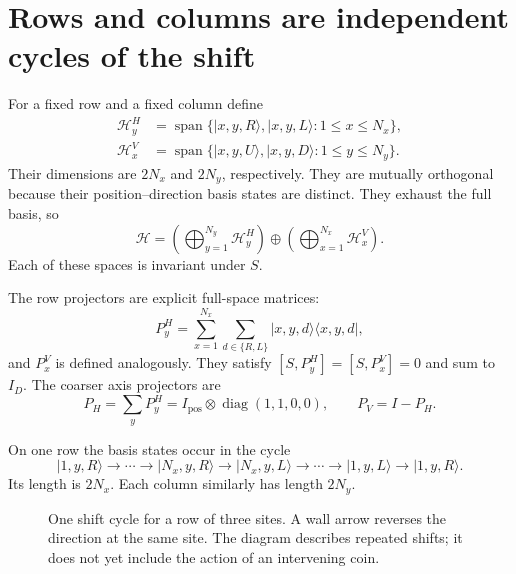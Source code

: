 \documentclass[11pt,a4paper,oneside]{report}
\newcommand{\ket}[1]{\lvert #1\rangle}
\newcommand{\bra}[1]{\langle #1\rvert}
\newcommand{\HH}{\mathcal H}
\newcommand{\Id}{I}
\newcommand{\diag}{\operatorname{diag}}
\newcommand{\spanof}{\operatorname{span}}
\numberwithin{equation}{chapter}
\begin{document}
\section{Rows and columns are independent cycles of the shift}

For a fixed row and a fixed column define
\begin{align}
\HH_y^{H}
&=\spanof\{\ket{x,y,R},\ket{x,y,L}:1\leq x\leq N_x\},\\
\HH_x^{V}
&=\spanof\{\ket{x,y,U},\ket{x,y,D}:1\leq y\leq N_y\}.
\end{align}
Their dimensions are \(2N_x\) and \(2N_y\), respectively. They are
mutually orthogonal because their position--direction basis states
are distinct. They exhaust the full basis, so
\begin{equation}
\boxed{
\HH=\left(\bigoplus_{y=1}^{N_y}\HH_y^H\right)
\oplus\left(\bigoplus_{x=1}^{N_x}\HH_x^V\right).
}
\label{eq:rowsum}
\end{equation}
Each of these spaces is invariant under \(S\).

The row projectors are explicit full-space matrices:
\begin{equation}
P_y^H=\sum_{x=1}^{N_x}\sum_{d\in\{R,L\}}
\ket{x,y,d}\bra{x,y,d},
\end{equation}
and \(P_x^V\) is defined analogously. They satisfy
\([S,P_y^H]=[S,P_x^V]=0\) and sum to \(\Id_D\).
The coarser axis projectors are
\[
P_H=\sum_yP_y^H=\Id_{\mathrm{pos}}\otimes\diag(1,1,0,0),
\qquad P_V=\Id-P_H.
\]

On one row the basis states occur in the cycle
\begin{equation}
\ket{1,y,R}\to\cdots\to\ket{N_x,y,R}
\to\ket{N_x,y,L}\to\cdots\to\ket{1,y,L}\to\ket{1,y,R}.
\end{equation}
Its length is \(2N_x\). Each column similarly has length \(2N_y\).

\begin{figure}[htbp]
\centering
{}
\caption{One shift cycle for a row of three sites. A wall arrow reverses
the direction at the same site. The diagram describes repeated shifts;
it does not yet include the action of an intervening coin.}
\end{figure}
\end{document}

